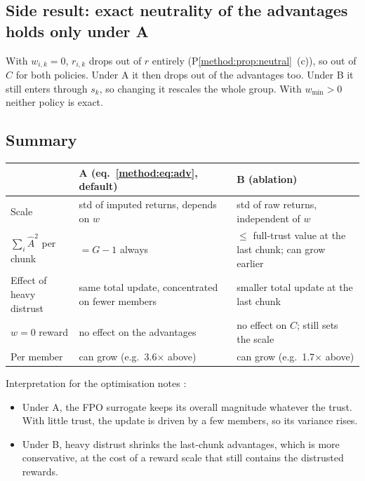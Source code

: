 \subsection{Side result: exact neutrality of the advantages holds only under A}

With $w_{i,k}=0$, $r_{i,k}$ drops out of $\hat r$ entirely (P\ref{method:prop:neutral}~(c)), so out
of $C$ for both policies. Under A it then drops out of the advantages too. Under B it still enters
through $s_k$, so changing it rescales the whole group. With $w_{\min}>0$ neither policy is exact.

\subsection{Summary}

\begin{center}
\small
\begin{tabularx}{\linewidth}{@{}lYY@{}}
\toprule
 & A (eq.~\eqref{method:eq:adv}, default) & B (ablation)\\
\midrule
Scale & std of imputed returns, depends on $w$ & std of raw returns, independent of $w$\\
$\sum_i \hat A^2$ per chunk & $= G-1$ always & $\le$ full-trust value at the last chunk; can grow earlier\\
Effect of heavy distrust & same total update, concentrated on fewer members & smaller total update at the last chunk\\
$w=0$ reward & no effect on the advantages & no effect on $C$; still sets the scale\\
Per member & can grow (e.g.\ 3.6$\times$ above) & can grow (e.g.\ 1.7$\times$ above)\\
\bottomrule
\end{tabularx}
\end{center}

Interpretation for the optimisation notes \chk:
\begin{itemize}
\item Under A, the FPO surrogate keeps its overall magnitude whatever the trust. With little trust,
  the update is driven by a few members, so its variance rises.
\item Under B, heavy distrust shrinks the last-chunk advantages, which is more conservative, at the
  cost of a reward scale that still contains the distrusted rewards.
\end{itemize}
